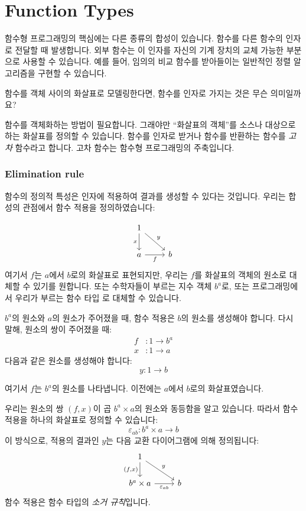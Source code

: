 \documentclass[DaoFP]{subfiles}
\begin{document}
\setcounter{chapter}{5}

\chapter{Function Types}

함수형 프로그래밍의 핵심에는 다른 종류의 합성이 있습니다. 함수를 다른 함수의 인자로 전달할 때 발생합니다. 외부 함수는 이 인자를 자신의 기계 장치의 교체 가능한 부분으로 사용할 수 있습니다. 예를 들어, 임의의 비교 함수를 받아들이는 일반적인 정렬 알고리즘을 구현할 수 있습니다.

함수를 객체 사이의 화살표로 모델링한다면, 함수를 인자로 가지는 것은 무슨 의미일까요?

함수를 객체화하는 방법이 필요합니다. 그래야만 ``화살표의 객체''를 소스나 대상으로 하는 화살표를 정의할 수 있습니다. 함수를 인자로 받거나 함수를 반환하는 함수를 \emph{고차} 함수라고 합니다. 고차 함수는 함수형 프로그래밍의 주축입니다.

\subsection{Elimination rule}

함수의 정의적 특성은 인자에 적용하여 결과를 생성할 수 있다는 것입니다. 우리는 합성의 관점에서 함수 적용을 정의하였습니다:

\[
 \begin{tikzcd}
 1
 \arrow[d, "x"']
 \arrow[rd, "y"]
 \\
 a
 \arrow[r, "f"']
& b
 \end{tikzcd}
\]
여기서 $f$는 $a$에서 $b$로의 화살표로 표현되지만, 우리는 $f$를 화살표의 객체의 원소로 대체할 수 있기를 원합니다. 또는 수학자들이 부르는 지수 객체 $b^a$로, 또는 프로그래밍에서 우리가 부르는 함수 타입 로 대체할 수 있습니다.

$b^a$의 원소와 $a$의 원소가 주어졌을 때, 함수 적용은 $b$의 원소를 생성해야 합니다. 다시 말해, 원소의 쌍이 주어졌을 때:
\begin{align*}
f &\colon 1 \to b^a \\
x &\colon 1 \to a
\end{align*}
다음과 같은 원소를 생성해야 합니다:
\[y \colon 1 \to b \]

여기서 $f$는 $b^a$의 원소를 나타냅니다. 이전에는 $a$에서 $b$로의 화살표였습니다.

우리는 원소의 쌍 $(f, x)$이 곱 $b^a \times a$의 원소와 동등함을 알고 있습니다. 따라서 함수 적용을 하나의 화살표로 정의할 수 있습니다:
\[\varepsilon_{a b} \colon b^a \times a \to b\]
이 방식으로, 적용의 결과인 $y$는 다음 교환 다이어그램에 의해 정의됩니다:
\[
 \begin{tikzcd}
 1
 \arrow[d, "{(f, x)}"']
 \arrow[rd, "y"]
 \\
 b^a \times a
 \arrow[r, "\varepsilon_{a b}"']
& b
 \end{tikzcd}
\]
함수 적용은 함수 타입의 \emph{소거 규칙}입니다.
\end{document}
